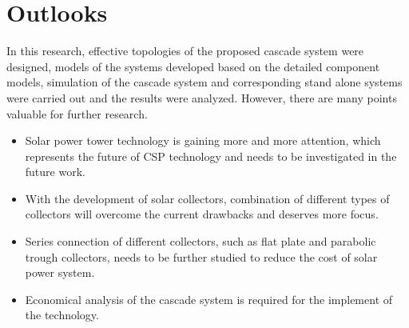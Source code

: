 \section{Outlooks}
In this research, effective topologies of the proposed cascade system were designed, models of the systems developed based on the detailed component models, simulation of the cascade system and corresponding stand alone systems were carried out and the results were analyzed. However, there are many points valuable for further research.
\begin{itemize}
  \item Solar power tower technology is gaining more and more attention, which represents the future of CSP technology and needs to be investigated in the future work. 
  \item With the development of solar collectors, combination of different types of collectors will overcome the current drawbacks and deserves more focus.
  \item Series connection of different collectors, such as flat plate and parabolic trough collectors, needs to be further studied to reduce the cost of solar power system.
  \item Economical analysis of the cascade system is required for the implement of the technology.
\end{itemize}